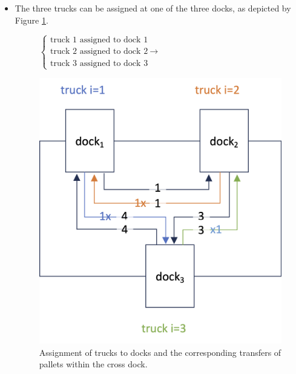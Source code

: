 \documentclass[preprint,12pt,authoryear]{elsarticle}
\begin{document}
\begin{itemize}
    \item The three trucks can be assigned at one of the three docks, as depicted by Figure \ref{fig:Example1Solution}.
    
        \begin{figure}[h!]
            \begin{minipage}[t]{0.4\textwidth}
                \hspace{10mm}
                    $\begin{cases}
                         \mbox{truck 1 assigned to dock 1}\\
                         \mbox{truck 2 assigned to dock 2} \ \longrightarrow \\
                         \mbox{truck 3 assigned to dock 3}
                    \end{cases} $
             \end{minipage}
             \begin{minipage}{0.7\textwidth}
                 \centering
                 \includegraphics[scale=0.12]{images/exemple1Solution.png} 
             \end{minipage}
             \caption{Assignment of trucks to docks and the corresponding transfers of pallets within the cross dock.}
             \label{fig:Example1Solution}
           \end{figure}  
    

\end{itemize}
\end{document}
